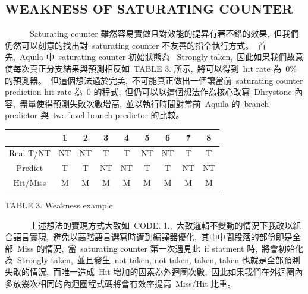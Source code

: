 \documentclass{article}
\begin{document}
\begin{CJK*}{UTF8}{bsmi}
\begin{multicols}{2}
\begin{center}
    \section*{WEAKNESS OF SATURATING COUNTER}
\end{center}

\begin{flushleft}
    \ \ \ \ \ \ Saturating counter 雖然容易實做且對效能的提昇有著不錯的效果,\
    但我們仍然可以刻意的找出對\ saturating counter 不友善的指令執行方式。\
    首先,\ Aquila 中\ saturating counter 初始狀態為 \ Strongly taken,\
    因此如果我們故意使每次真正分支結果與預測相反如\ TABLE 3. 所示,\
    將可以得到\ hit rate 為\ 0\% 的預測器。\
    但這個想法過於完美,\
    不可能真正做出一個讓當前\ saturating counter prediction hit rate 為\ 0 的程式,\
    但仍可以以這個想法作為核心改寫\ Dhrystone 內容,\
    盡量使得預測失敗次數增高,\
    並以執行時間對當前\ Aquila 的\ branch predictor 與\ two-level branch predictor 的比較。\
\end{flushleft}

\begin{flushleft}
\begin{tabular}{||c c c c c c c c c||} 
    \hline
     & 1 & 2 & 3 & 4 & 5 & 6 & 7 & 8 \\ [1.5ex] 
    \hline\hline
    Real T/NT &  NT & NT & T & T & NT & NT & T & T  \\ 
    \hline
    Predict  &  T & T & NT & NT & T & T & NT & NT  \\ 
    \hline
    Hit/Miss & M & M & M & M & M  & M & M & M \\
    \hline
\end{tabular}
\end{flushleft}

\begin{center}
    \small{TABLE 3. Weakness example}\\
\end{center}

\newpage

\begin{flushleft}
    \ \ \ \ \ \ 上述想法的實現方式大致如\ CODE. 1.,\
    大致邏輯不變動的情況下我改以組合語言實現,\
    避免以高階語言選寫時遭到編譯器優化,\
    其中中間段落的部份即是全部\ Miss 的情況,\
    當\ saturating counter 第一次遇見此\ if statment 時,\
    將會初始化為\ Strongly taken,\
    並且發生\ not taken, not taken, taken, taken 也就是全部預測失敗的情況,\
    而唯一造成\ Hit 增加的因素為外迴圈次數,\
    因此如果我們在外迴圈內多放幾次相同的內迴圈程式碼將會有效率提高\ Miss/Hit 比重。\
\end{flushleft}


\end{multicols}
\end{CJK*}
\end{document}
